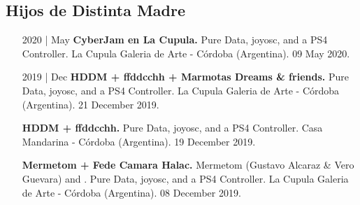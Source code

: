 \documentclass[12pt,overlapped]{res}%
\begin{document}
\begin{resume}
\subsection{Hijos de Distinta Madre}%
\fullline%
\begin{itemize}[align=parleft,leftmargin=2.25cm,labelwidth=2cm]
\item[2020 | May]
\textbf{CyberJam en La Cupula.}
Pure Data, joyosc, and a PS4 Controller. 
La Cupula Galeria de Arte {-} Córdoba (Argentina). 
09 May 2020.
\end{itemize}%
\begin{itemize}[align=parleft,leftmargin=2.25cm,labelwidth=2cm]
\item[2019 | Dec]
\textbf{HDDM + ffddcchh + Marmotas Dreams \& friends.}
Pure Data, joyosc, and a PS4 Controller. 
La Cupula Galeria de Arte {-} Córdoba (Argentina). 
21 December 2019.
\end{itemize}%
\begin{itemize}[align=parleft,leftmargin=2.25cm,labelwidth=2cm]
\item[]
\textbf{HDDM + ffddcchh.}
Pure Data, joyosc, and a PS4 Controller. 
Casa Mandarina {-} Córdoba (Argentina). 
19 December 2019.
\end{itemize}%
\begin{itemize}[align=parleft,leftmargin=2.25cm,labelwidth=2cm]
\item[]
\textbf{Mermetom + Fede Camara Halac.}
Mermetom (Gustavo Alcaraz \& Vero Guevara) and . 
Pure Data, joyosc, and a PS4 Controller. 
La Cupula Galeria de Arte {-} Córdoba (Argentina). 
08 December 2019.
\end{itemize}%

\end{resume}
\end{document}
